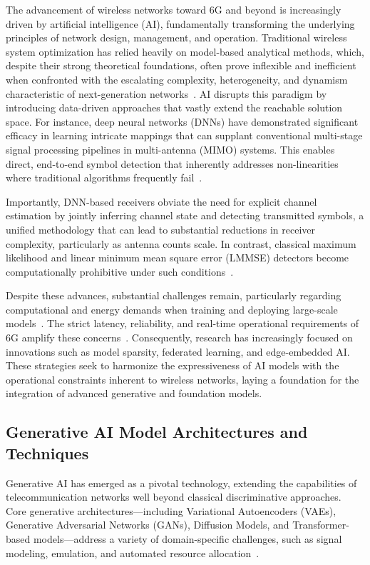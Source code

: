 \documentclass[sigconf]{acmart}
\begin{document}
The advancement of wireless networks toward 6G and beyond is increasingly driven by artificial intelligence (AI), fundamentally transforming the underlying principles of network design, management, and operation. Traditional wireless system optimization has relied heavily on model-based analytical methods, which, despite their strong theoretical foundations, often prove inflexible and inefficient when confronted with the escalating complexity, heterogeneity, and dynamism characteristic of next-generation networks~\cite{ref46}. AI disrupts this paradigm by introducing data-driven approaches that vastly extend the reachable solution space. For instance, deep neural networks (DNNs) have demonstrated significant efficacy in learning intricate mappings that can supplant conventional multi-stage signal processing pipelines in multi-antenna (MIMO) systems. This enables direct, end-to-end symbol detection that inherently addresses non-linearities where traditional algorithms frequently fail~\cite{ref43}. 

Importantly, DNN-based receivers obviate the need for explicit channel estimation by jointly inferring channel state and detecting transmitted symbols, a unified methodology that can lead to substantial reductions in receiver complexity, particularly as antenna counts scale. In contrast, classical maximum likelihood and linear minimum mean square error (LMMSE) detectors become computationally prohibitive under such conditions~\cite{ref43}. 

Despite these advances, substantial challenges remain, particularly regarding computational and energy demands when training and deploying large-scale models~\cite{ref49}. The strict latency, reliability, and real-time operational requirements of 6G amplify these concerns~\cite{ref46}. Consequently, research has increasingly focused on innovations such as model sparsity, federated learning, and edge-embedded AI. These strategies seek to harmonize the expressiveness of AI models with the operational constraints inherent to wireless networks, laying a foundation for the integration of advanced generative and foundation models.

\subsection{Generative AI Model Architectures and Techniques}

Generative AI has emerged as a pivotal technology, extending the capabilities of telecommunication networks well beyond classical discriminative approaches. Core generative architectures—including Variational Autoencoders (VAEs), Generative Adversarial Networks (GANs), Diffusion Models, and Transformer-based models—address a variety of domain-specific challenges, such as signal modeling, emulation, and automated resource allocation~\cite{ref1,ref7,ref13,ref21,ref26,ref33,ref44}. 
\end{document}
